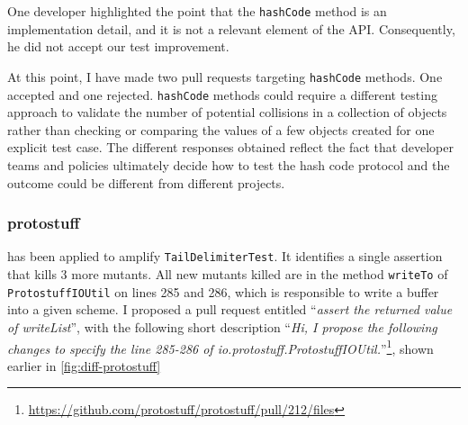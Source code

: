 One developer highlighted the point that the \texttt{hashCode} method is an implementation detail, and it is not a relevant element of the API. 
Consequently, he did not accept our test improvement.

At this point, I have made two pull requests targeting \texttt{hashCode} methods. 
One accepted and one rejected. 
\texttt{hashCode} methods could require a different testing approach to validate the number of potential collisions in a collection of objects rather than checking or comparing the values of a few objects created for one explicit test case.
The different responses obtained reflect the fact that developer teams and policies ultimately decide how to test the hash code protocol and the outcome could be different from different projects.



\subsubsection{protostuff}

\dspot has been applied to amplify \texttt{TailDelimiterTest}. 
It identifies a single assertion that kills 3 more mutants.
All new mutants killed are in the method \texttt{writeTo} of \texttt{ProtostuffIOUtil} on lines 285 and 286, which is responsible to write a buffer into a given scheme. 
I proposed a pull request entitled ``\emph{assert the returned value of writeList}'', with the following short description ``\emph{Hi, I propose the following changes to specify the line 285-286 of io.protostuff.ProtostuffIOUtil.}''\footnote{\url{https://github.com/protostuff/protostuff/pull/212/files}}, shown earlier in \autoref{fig:diff-protostuff}

